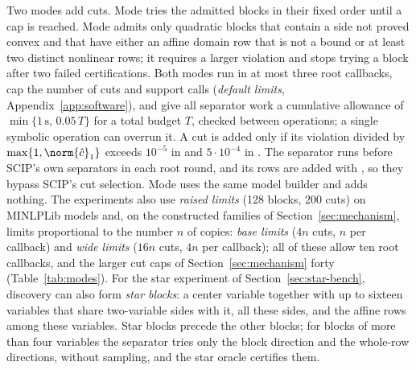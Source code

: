Two modes add cuts. Mode  tries the admitted blocks in their fixed
order until a cap is reached. Mode  admits only quadratic blocks
that contain a side not proved convex and that have either an affine domain
row that is not a bound or at least two distinct nonlinear rows; it requires
a larger violation and stops trying a block after two failed certifications.
Both modes run in at most three root callbacks, cap the number of cuts and
support calls (\emph{default limits}, Appendix~\ref{app:software}), and give
all separator work a cumulative allowance of $\min\{1\,\mathrm s,\,0.05\,T\}$
for a total budget $T$, checked between operations; a single symbolic
operation can overrun it. A cut is added only if its violation divided by
$\max\{1,\norm{\hat c}_1\}$ exceeds $10^{-5}$ in  and
$5\cdot10^{-4}$ in . The separator runs before SCIP's own
separators in each root round, and its rows are added with ,
so they bypass SCIP's cut selection. Mode  uses the same model
builder and adds nothing. The experiments also use \emph{raised limits} (128
blocks, 200 cuts) on MINLPLib models and, on the constructed families of
Section~\ref{sec:mechanism}, limits proportional to the number $n$ of copies:
\emph{base limits} ($4n$ cuts, $n$ per callback) and \emph{wide limits} ($16n$
cuts, $4n$ per callback); all of these allow ten root callbacks, and the larger
cut caps of Section~\ref{sec:mechanism} forty (Table~\ref{tab:modes}). For the star experiment of Section~\ref{sec:star-bench},
discovery can also form \emph{star blocks}: a center variable together with up
to sixteen variables that share two-variable sides with it, all these sides,
and the affine rows among these variables. Star blocks precede the other
blocks; for blocks of more than four variables the separator tries only the
block direction and the whole-row directions, without sampling, and the star
oracle certifies them.
